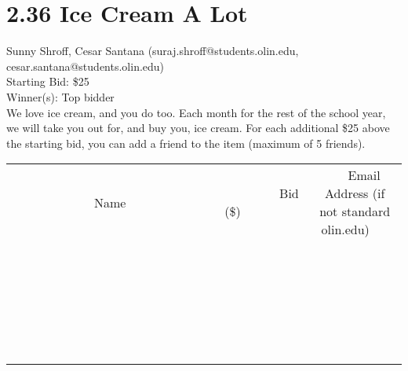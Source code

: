 \documentclass[11pt]{article}
\begin{document}
\section*{2.36 Ice Cream A Lot}
Sunny Shroff, Cesar Santana (suraj.shroff@students.olin.edu, cesar.santana@students.olin.edu) \\
Starting Bid: \$25 \\
Winner(s): 
Top bidder \\
We love ice cream, and you do too. Each month for the rest of the school year, we will take you out for, and buy you, ice cream. For each additional \$25 above the starting bid, you can add a friend to the item (maximum of 5 friends). \\[6ex]
\begin{tabular}{c c c}
~~~~~~~~~~~~~Name~~~~~~~~~~~~~ & ~~~~~~~~~Bid (\$)~~~~~~~~~ & ~~~Email Address (if not standard olin.edu)~~~ \\
 & & \\
\hline
 & & \\
\hline
 & & \\
\hline
 & & \\
\hline
 & & \\
\hline
 & & \\
\hline
 & & \\
\hline
 & & \\
\hline
 & & \\
\hline
 & & \\
\hline
 & & \\
\hline
 & & \\
\hline
 & & \\
\hline
 & & \\
\hline
 & & \\
\hline
 & & \\
\hline
 & & \\
\hline
 & & \\
\hline
 & & \\
\hline
 & & \\
\hline
 & & \\
\hline
 & & \\
\hline
 & & \\
\hline
 & & \\
\hline
 & & \\
\hline
 & & \\
\hline
\end{tabular}
\clearpage
\end{document}
